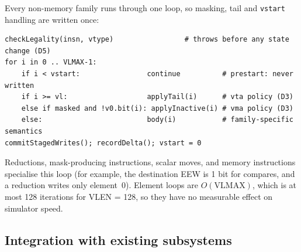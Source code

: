 \documentclass[11pt]{article}
\begin{document}
Every non-memory family runs through one loop, so masking, tail and \texttt{vstart} handling are
written once:

\begin{lstlisting}[language={},morekeywords={for,if,else,continue,throw}]
checkLegality(insn, vtype)                 # throws before any state change (D5)
for i in 0 .. VLMAX-1:
    if i < vstart:                continue          # prestart: never written
    if i >= vl:                   applyTail(i)      # vta policy (D3)
    else if masked and !v0.bit(i): applyInactive(i) # vma policy (D3)
    else:                         body(i)           # family-specific semantics
commitStagedWrites(); recordDelta(); vstart = 0
\end{lstlisting}

Reductions, mask-producing instructions, scalar moves,  and memory instructions
specialise this loop (for example, the destination EEW is 1 bit for compares, and a reduction writes
only element~0). Element loops are $O(\mathrm{VLMAX})$, which is at most 128 iterations for
VLEN = 128, so they have no measurable effect on simulator speed.

\subsection{Integration with existing subsystems}
\end{document}
